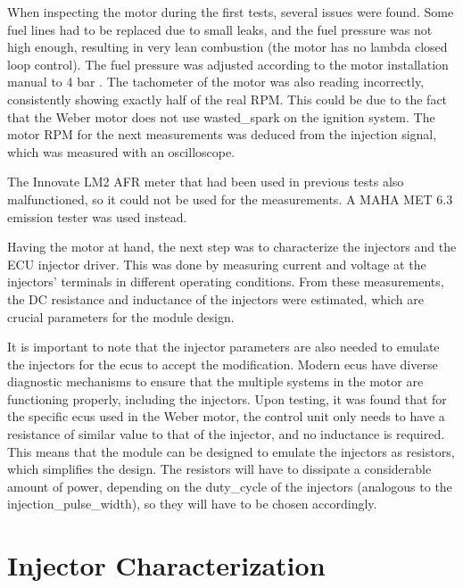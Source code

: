 
    When inspecting the motor during the first tests, several issues were found. Some fuel lines had to be replaced due to small leaks, and the fuel pressure was not high enough, resulting in very lean combustion (the motor has no lambda closed loop control). The fuel pressure was adjusted according to the motor installation manual to 4 bar \autocite{textronmotorsgmbhINSTALLATIONMANUAL4Stroke2013}. The tachometer of the motor was also reading incorrectly, consistently showing exactly half of the real RPM. This could be due to the fact that the Weber motor does not use \gls{wasted_spark} on the ignition system. The motor RPM for the next measurements was deduced from the injection signal, which was measured with an oscilloscope. 
    
    The Innovate LM2 AFR meter that had been used in previous tests also malfunctioned, so it could not be used for the measurements. A MAHA MET 6.3 emission tester was used instead.

    Having the motor at hand, the next step was to characterize the injectors and the ECU injector driver. This was done by measuring current and voltage at the injectors' terminals in different operating conditions. From these measurements, the DC resistance and inductance of the injectors were estimated, which are crucial parameters for the module design. 

    It is important to note that the injector parameters are also needed to emulate the injectors for the \gls{ecu}s to accept the modification. Modern \gls{ecu}s have diverse diagnostic mechanisms to ensure that the multiple systems in the motor are functioning properly, including the injectors. Upon testing, it was found that for the specific \gls{ecu}s used in the Weber motor, the control unit only needs to have a resistance of similar value to that of the injector, and no inductance is required. This means that the module can be designed to emulate the injectors as resistors, which simplifies the design. The resistors will have to dissipate a considerable amount of power, depending on the \gls{duty_cycle} of the injectors (analogous to the \gls{injection_pulse_width}), so they will have to be chosen accordingly.

    \section{Injector Characterization}

